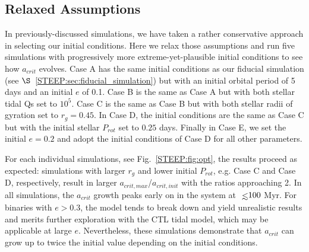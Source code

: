 \subsection{Relaxed Assumptions} \label{STEEP:sec:optimistic}

In previously-discussed simulations, we have taken a rather conservative approach in selecting our initial conditions.  Here we relax those assumptions and run five simulations with progressively more extreme-yet-plausible initial conditions to see how $a_{crit}$ evolves. Case A has the same initial conditions as our fiducial simulation (see $\S$~\ref{STEEP:sec:fiducial_simulation}) but with an initial orbital period of 5 days and an initial $e$ of 0.1.  Case B is the same as Case A but with both stellar tidal Qs set to $10^5$.  Case C is the same as Case B but with both stellar radii of gyration set to $r_g = 0.45$.  In Case D, the initial conditions are the same as Case C but with the initial stellar $P_{rot}$ set to $0.25$ days.  Finally in Case E, we set the initial $e=0.2$ and adopt the initial conditions of Case D for all other parameters.

For each individual simulations, see Fig.~\ref{STEEP:fig:opt}, the results proceed as expected: simulations with larger $r_g$ and lower initial $P_{rot}$, e.g. Case C and Case D, respectively, result in larger $a_{crit,max}$/$a_{crit,init}$ with the ratios approaching 2.  In all simulations, the $a_{crit}$ growth peaks early on in the system at $\lsim 100$ Myr.  For binaries with $e > 0.3$, the model tends to break down and yield unrealistic results and merits further exploration with the CTL tidal model, which may be applicable at large $e$.  Nevertheless, these simulations demonstrate that $a_{crit}$ can grow up to twice the initial value depending on the initial conditions.


